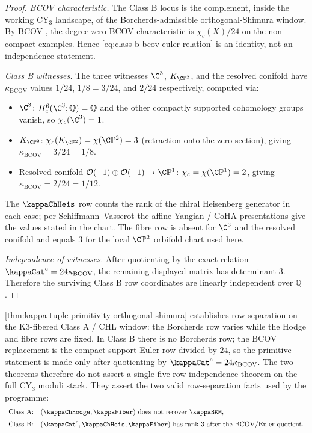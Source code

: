 \begin{proof}
\emph{BCOV characteristic.}
The Class B locus is the complement, inside the working CY$_3$
landscape, of the Borcherds-admissible orthogonal-Shimura window.  By
BCOV \cite{BCOV93,BCOV94}, the degree-zero BCOV characteristic is
\(\chi_c(X)/24\) on the non-compact examples.  Hence
\eqref{eq:class-b-bcov-euler-relation} is an identity, not an
independence statement.

\emph{Class B witnesses.}
The three witnesses $\C^3$, $K_{\C\mathbb{P}^2}$, and the resolved
conifold have $\kappa_{\mathrm{BCOV}}$ values $1/24$, $1/8 = 3/24$,
and $2/24$ respectively, computed via:
\begin{itemize}
\item $\C^3$: \(H_c^6(\C^3;\mathbb Q)=\mathbb Q\) and the other
compactly supported cohomology groups vanish, so \(\chi_c(\C^3)=1\).
\item $K_{\C\mathbb{P}^2}$: $\chi_c(K_{\C\mathbb{P}^2}) = \chi(\C\mathbb{P}^2) = 3$
\textup(retraction onto the zero section\textup), giving
$\kappa_{\mathrm{BCOV}} = 3/24 = 1/8$.
\item Resolved conifold $\mathcal{O}(-1) \oplus \mathcal{O}(-1) \to \C\mathbb{P}^1$:
$\chi_c = \chi(\C\mathbb{P}^1) = 2$, giving $\kappa_{\mathrm{BCOV}} = 2/24 = 1/12$.
\end{itemize}
The $\kappaChHeis$ row counts the rank of the chiral Heisenberg
generator in each case; per Schiffmann--Vasserot
\cite{SchiffmannVasserot2013} the affine Yangian / CoHA presentations
give the values stated in the chart.  The fibre row is absent for
\(\C^3\) and the resolved conifold and equals \(3\) for the local
\(\C\mathbb P^2\) orbifold chart used here.

\emph{Independence of witnesses.}
After quotienting by the exact relation
\(\kappaCat^{\mathrm c}=24\kappa_{\mathrm{BCOV}}\), the remaining
displayed matrix has determinant \(3\).  Therefore the surviving
Class B row coordinates are linearly independent over \(\mathbb Q\).
\end{proof}

\begin{remark}
\label{rem:kappa-primitivity-AB-joint}
\cref{thm:kappa-tuple-primitivity-orthogonal-shimura} establishes
row separation on the K3-fibered Class A / CHL window: the Borcherds
row varies while the Hodge and fibre rows are fixed.  In Class B there
is no Borcherds row; the BCOV replacement is the compact-support Euler
row divided by \(24\), so the primitive statement is made only after
quotienting by
\(\kappaCat^{\mathrm c}=24\kappa_{\mathrm{BCOV}}\).  The two theorems
therefore do not assert a single five-row independence theorem on the
full CY$_3$ moduli stack.  They assert the two valid row-separation
facts used by the programme:
\[
\begin{array}{ll}
\textup{Class A:} &
(\kappaChHodge,\kappaFiber)\ \textup{does not recover}\ \kappaBKM,\\[2mm]
\textup{Class B:} &
(\kappaCat^{\mathrm c},\kappaChHeis,\kappaFiber)\ \textup{has rank }3
\textup{ after the BCOV/Euler quotient.}
\end{array}
\]
\end{remark}

